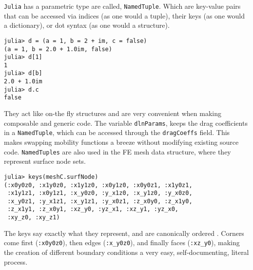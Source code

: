 \texttt{Julia} has a parametric type are called, \texttt{NamedTuple}.
Which are key-value pairs that can be accessed via indices (as one would a tuple), their keys (as one would a dictionary), or dot syntax (as one would a structure).
\begin{verbatim}
julia> d = (a = 1, b = 2 + im, c = false)
(a = 1, b = 2.0 + 1.0im, false)
julia> d[1]
1
julia> d[b]
2.0 + 1.0im
julia> d.c
false
\end{verbatim}
They act like on-the fly structures and are very convenient when making composable and generic code. The variable \texttt{dlnParams}, keeps the drag coefficients in a \texttt{NamedTuple}, which can be accessed through the \texttt{dragCoeffs} field. This makes swapping mobility functions a breeze without modifying existing source code. \texttt{NamedTuples} are also used in the FE mesh data structure, where they represent surface node sets.
\begin{verbatim}
julia> keys(meshC.surfNode)
(:x0y0z0, :x1y0z0, :x1y1z0, :x0y1z0, :x0y0z1, :x1y0z1, 
 :x1y1z1, :x0y1z1, :x_y0z0, :y_x1z0, :x_y1z0, :y_x0z0, 
 :x_y0z1, :y_x1z1, :x_y1z1, :y_x0z1, :z_x0y0, :z_x1y0, 
 :z_x1y1, :z_x0y1, :xz_y0, :yz_x1, :xz_y1, :yz_x0, 
 :xy_z0, :xy_z1)
\end{verbatim}
The keys say exactly what they represent, and are canonically ordered \cite{femcanonical}. Corners come first (\texttt{:x0y0z0}), then edges (\texttt{:x_y0z0}), and finally faces (\texttt{:xz_y0}), making the creation of different boundary conditions a very easy, self-documenting, literal process.

